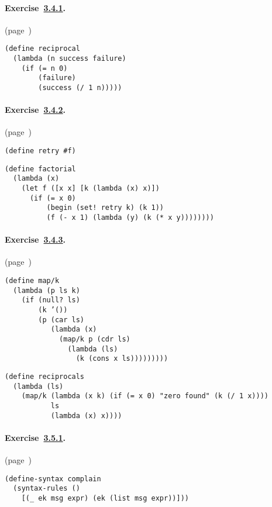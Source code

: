\paragraph{Exercise \hyperref[further_g76]{3.4.1}. }(page \pageref{further_s75})

  
\begin{alltt}
 (define reciprocal
   (lambda (n success failure)
     (if (= n 0)
         (failure)
         (success (/ 1 n)))))
\end{alltt}



\paragraph{Exercise \hyperref[further_g77]{3.4.2}. }(page \pageref{further_s77})

  
\begin{alltt}
 (define retry \#{}f) 

(define factorial
   (lambda (x)
     (let f ([x x] [k (lambda (x) x)])
       (if (= x 0)
           (begin (set! retry k) (k 1))
           (f (- x 1) (lambda (y) (k (* x y))))))))
\end{alltt}



\paragraph{Exercise \hyperref[further_g78]{3.4.3}. }(page \pageref{further_s79})

  
\begin{alltt}
 (define map/k
   (lambda (p ls k)
     (if (null? ls)
         (k '())
         (p (car ls)
            (lambda (x)
              (map/k p (cdr ls)
                (lambda (ls)
                  (k (cons x ls))))))))) 

(define reciprocals
   (lambda (ls)
     (map/k (lambda (x k) (if (= x 0) "zero found" (k (/ 1 x))))
            ls
            (lambda (x) x))))
\end{alltt}



\paragraph{Exercise \hyperref[further_g80]{3.5.1}. }(page \pageref{further_s86})

  
\begin{alltt}
 (define-syntax complain
   (syntax-rules ()
     [(\_{} ek msg expr) (ek (list msg expr))]))
\end{alltt}




